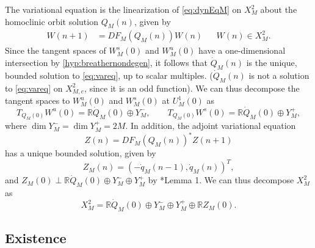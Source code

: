 \documentclass[12pt,reqno]{amsart}
\def\R{{\mathbb R}}
\begin{document}
The variational equation is the linearization of \cref{eq:dynEqM} on $X_M^2$ about the homoclinic orbit solution $Q_M(n)$, given by
\begin{equation}\label{eq:vareq}
\begin{aligned}
W(n+1) &= DF_M(Q_M(n)) W(n) && W(n) \in X_M^2.
\end{aligned}
\end{equation}
Since the tangent spaces of $W_M^s(0)$ and $W_M^u(0)$ have a one-dimensional intersection by \cref{hyp:breathernondegen}, it follows that $\dot{Q}_M(n)$ is the unique, bounded solution to \cref{eq:vareq}, up to scalar multiples. ($\dot{Q}_M(n)$ is not a solution to \cref{eq:vareq} on $X_{M,e}^2$, since it is an odd function). We can thus decompose the tangent spaces to $W_M^u(0)$ and $W_M^s(0)$ at $U_M^1(0)$ as
\begin{equation}\label{eq:TWdecomp}
T_{Q_M(0)}W^u(0) = \R \dot{Q}_M(0) \oplus Y_M^-, \qquad  
T_{Q_M(0)}W^s(0) = \R \dot{Q}_M(0) \oplus Y_M^+,
\end{equation}
where $\dim Y_M^- = \dim Y_M^+ = 2M$. In addition, the adjoint variational equation
\begin{equation}\label{eq:adjvareq}
Z(n) = DF_M(Q_M(n))^* Z(n+1)
\end{equation}
has a unique bounded solution, given by
\begin{equation}\label{eq:Z1}
Z_M(n) = (-\dot{q}_M(n-1), \dot{q}_M(n))^T,
\end{equation}
and $Z_M(0) \perp \R \dot{Q}_M(0) \oplus Y_M^- \oplus Y_M^+$ by \cite{Parker2020}*{Lemma 1}. We can thus decompose $X_M^2$ as
\begin{equation}\label{eq:Xdecomp}
X_M^2= \R \dot{Q}_M(0) \oplus Y_M^- \oplus Y_M^+ \oplus \R Z_M(0).
\end{equation}

\subsection{Existence}
\end{document}
